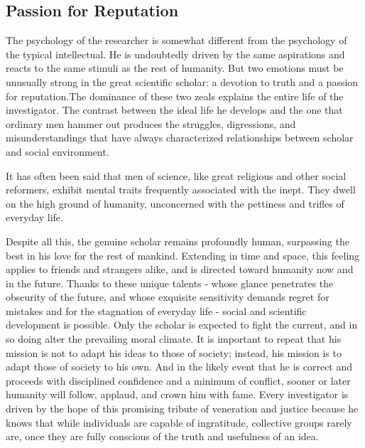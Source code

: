 \documentclass{article}
\begin{document}
\subsection*{Passion for Reputation}

The psychology of the researcher is somewhat different from the psychology of the typical intellectual. He is undoubtedly driven by the same aspirations and reacts to the same stimuli as the rest of humanity. But two emotions must be unusually strong in the great scientific scholar: a devotion to truth and a passion for reputation.The dominance of these two zeals explains the entire life of the investigator. The contrast between the ideal life he develops and the one that ordinary men hammer out produces the struggles, digressions, and misunderstandings that have always characterized relationships between scholar and social environment.

It has often been said that men of science, like great religious and other social reformers, exhibit mental traits frequently associated with the inept. They dwell on the high ground of humanity, unconcerned with the pettiness and trifles of everyday life.

Despite all this, the genuine scholar remains profoundly human, surpassing the best in his love for the rest of mankind. Extending in time and space, this feeling applies to friends and strangers alike, and is directed toward humanity now and in the future. Thanks to these unique talents - whose glance penetrates the obscurity of the future, and whose exquisite sensitivity demands regret for mistakes and for the stagnation of everyday life - social and scientific development is possible. Only the scholar is expected to fight the current, and in so doing alter the prevailing moral climate. It is important to repeat that his mission is not to adapt his ideas to those of society; instead, his mission is to adapt those of society to his own. And in the likely event that he is correct and proceeds with disciplined confidence and a minimum of conflict, sooner or later humanity will follow, applaud, and crown him with fame. Every investigator is driven by the hope of this promising tribute of veneration and justice because he knows that while individuals are capable of ingratitude, collective groups rarely are, once they are fully conscious of the truth and usefulness of an idea.
\end{document}
